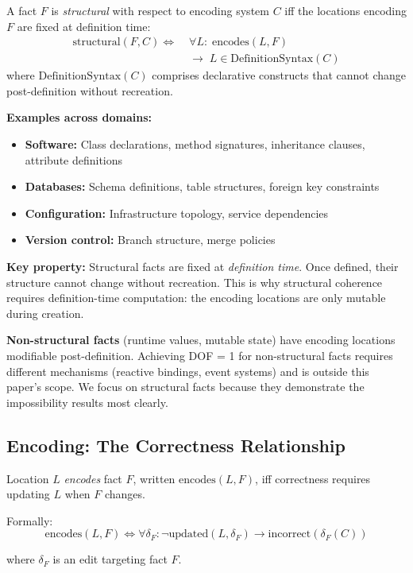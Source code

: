 \begin{definition}\label{def:structural-fact}
A fact $F$ is \emph{structural} with respect to encoding system $C$ iff the locations encoding $F$ are fixed at definition time:
\[
\begin{aligned}
\text{structural}(F, C) \Longleftrightarrow\;
&\forall L:\; \text{encodes}(L, F) \\
&\rightarrow\; L \in \text{DefinitionSyntax}(C)
\end{aligned}
\]
where $\text{DefinitionSyntax}(C)$ comprises declarative constructs that cannot change post-definition without recreation.
\end{definition}

\textbf{Examples across domains:}
\begin{itemize}
\tightlist
\item \textbf{Software:} Class declarations, method signatures, inheritance clauses, attribute definitions
\item \textbf{Databases:} Schema definitions, table structures, foreign key constraints
\item \textbf{Configuration:} Infrastructure topology, service dependencies
\item \textbf{Version control:} Branch structure, merge policies
\end{itemize}

\textbf{Key property:} Structural facts are fixed at \emph{definition time}. Once defined, their structure cannot change without recreation. This is why structural coherence requires definition-time computation: the encoding locations are only mutable during creation.

\textbf{Non-structural facts} (runtime values, mutable state) have encoding locations modifiable post-definition. Achieving DOF = 1 for non-structural facts requires different mechanisms (reactive bindings, event systems) and is outside this paper's scope. We focus on structural facts because they demonstrate the impossibility results most clearly.

\subsection{Encoding: The Correctness Relationship}\label{sec:encoding}

\begin{definition}[Encodes]\label{def:encodes}
Location $L$ \emph{encodes} fact $F$, written $\text{encodes}(L, F)$, iff correctness requires updating $L$ when $F$ changes.

Formally:
\[
\text{encodes}(L, F) \Longleftrightarrow \forall \delta_F: \neg\text{updated}(L, \delta_F) \rightarrow \text{incorrect}(\delta_F(C))
\]

where $\delta_F$ is an edit targeting fact $F$.
\end{definition}

